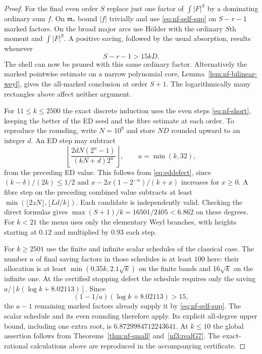 \documentclass[11pt,letterpaper]{article}
\theoremstyle{definition}
\numberwithin{equation}{section}
\begin{document}
\begin{proof}
For the final even order $S$ replace just one factor of
$\int |F|^S$ by a dominating ordinary sum $f$. On $\mathfrak m_*$
bound $|f|$ trivially and use \eqref{eq:nf-self-sup} on $S-r-1$
marked factors. On the broad major arcs use H\"older with the
ordinary $S$th moment and $\int|F|^S$. A positive saving, followed
by the usual absorption, results whenever
\[
                         S-r-1>15kD .
\]
The shell can now be pruned with this same ordinary factor.
Alternatively the marked pointwise estimate on a narrow polynomial
core, Lemma~\ref{lem:nf-bilinear-weyl}, gives the all-marked
conclusion at order $S+1$. The logarithmically many rectangles
above affect neither argument.

For $11\le k\le2500$ the exact discrete induction uses the even
steps \eqref{eq:nf-short}, keeping the better of the ED seed and
the fibre estimate at each order. To reproduce the rounding, write
$N=10^9$ and store $ND$ rounded upward to an integer $d$.
An ED step may subtract
\[
 \left\lfloor\frac{2dN(2^u-1)}{(kN+d)2^u}\right\rfloor,
                   \qquad u=\min(k,32),
\]
from the preceding ED value. This follows from \eqref{eq:eddefect},
since $(k-\delta)/(2k)\le1/2$ and
$x-2x(1-2^{-u})/(k+x)$ increases for $x\ge0$.
A fibre step on the preceding combined value subtracts at least
$\min(\lfloor2zN\rfloor,\lfloor Ld/k\rfloor)$.
Each candidate is independently valid. Checking the direct formulas
gives $\max(S+1)/k=16501/2405<6.862$ on these degrees.
For $k<21$ the menu uses only the elementary Weyl branches, with
heights starting at $0.12$ and multiplied by $0.93$ each step.

For $k\ge2501$ use the finite and infinite scalar schedules of the
classical case. The number $a$ of final saving factors in those
schedules is at least $100$ here: their allocation is at least
$\min(0.35k,2.1\sqrt k)$ on the finite bands and $16\sqrt k$
on the infinite one. At the certified stopping defect the schedule
requires only the saving $a/[k(\log k+8.02113)]$. Since
\[
       (1-1/a)(\log k+8.02113)>15 ,
\]
the $a-1$ remaining marked factors already supply it by
\eqref{eq:nf-self-sup}. The scalar schedule and its even rounding
therefore apply. Its explicit all-degree upper bound, including one
extra root, is $6.8729984712243641$. At $k\le10$ the global
assertion follows from Theorems~\ref{thm:nf-small}
and~\ref{nf3:realG7}. The exact-rational calculations above are
reproduced in the accompanying certificate.


\end{proof}
\end{document}
